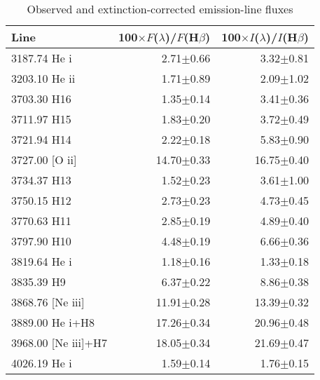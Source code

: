 \begin{table}
\caption{Observed and extinction-corrected emission-line fluxes \label{tab2}}
\begin{tabular}{lrr} \hline
Line&100$\times$$F$($\lambda$)/$F$(H$\beta$)&100$\times$$I$($\lambda$)/$I$(H$\beta$) \\ \hline
3187.74 He {\sc i}              &  2.71$\pm$0.66&  3.32$\pm$0.81\\
3203.10 He {\sc ii}             &  1.71$\pm$0.89&  2.09$\pm$1.02\\
3703.30 H16                     &  1.35$\pm$0.14&  3.41$\pm$0.36\\
3711.97 H15                     &  1.83$\pm$0.20&  3.72$\pm$0.49\\
3721.94 H14                     &  2.22$\pm$0.18&  5.83$\pm$0.90\\
3727.00 [O {\sc ii}]            & 14.70$\pm$0.33& 16.75$\pm$0.40\\
3734.37 H13                     &  1.52$\pm$0.23&  3.61$\pm$1.00\\
3750.15 H12                     &  2.73$\pm$0.23&  4.73$\pm$0.45\\
3770.63 H11                     &  2.85$\pm$0.19&  4.89$\pm$0.40\\
3797.90 H10                     &  4.48$\pm$0.19&  6.66$\pm$0.36\\
3819.64 He {\sc i}              &  1.18$\pm$0.16&  1.33$\pm$0.18\\
3835.39 H9                      &  6.37$\pm$0.22&  8.86$\pm$0.38\\
3868.76 [Ne {\sc iii}]          & 11.91$\pm$0.28& 13.39$\pm$0.32\\
3889.00 He {\sc i}+H8           & 17.26$\pm$0.34& 20.96$\pm$0.48\\
3968.00 [Ne {\sc iii}]+H7       & 18.05$\pm$0.34& 21.69$\pm$0.47\\
4026.19 He {\sc i}              &  1.59$\pm$0.14&  1.76$\pm$0.15\\

\end{tabular}
\end{table}
